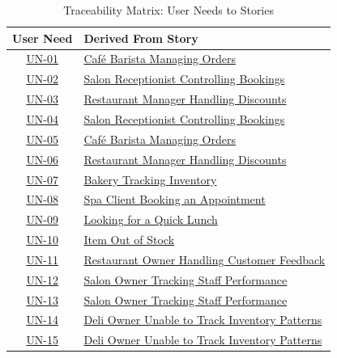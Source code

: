 \documentclass[]{VUMIFTemplateClass}
\begin{document}
\begin{table}[H]
\centering
\caption{Traceability Matrix: User Needs to Stories}
\begin{tabular}{|c|l|}
\hline
\textbf{User Need}  & \textbf{Derived From Story} \\
\hline
\hyperref[UN-01]{UN-01} & \hyperref[subsubsubsec:barista-orders]{Café Barista Managing Orders} \\
\hline
\hyperref[UN-02]{UN-02} & \hyperref[subsubsubsec:salon-receptionist]{Salon Receptionist Controlling Bookings} \\
\hline
\hyperref[UN-03]{UN-03} & \hyperref[subsubsubsec:restaurant-discounts]{Restaurant Manager Handling Discounts} \\
\hline
\hyperref[UN-04]{UN-04} & \hyperref[subsubsubsec:salon-receptionist]{Salon Receptionist Controlling Bookings} \\
\hline
\hyperref[UN-05]{UN-05} & \hyperref[subsubsubsec:barista-orders]{Café Barista Managing Orders} \\
\hline
\hyperref[UN-06]{UN-06} & \hyperref[subsubsubsec:restaurant-discounts]{Restaurant Manager Handling Discounts} \\
\hline
\hyperref[UN-07]{UN-07} & \hyperref[subsubsubsec:bakery-inventory]{Bakery Tracking Inventory} \\
\hline
\hyperref[UN-08]{UN-08} & \hyperref[subsubsubsec:spa-booking]{Spa Client Booking an Appointment} \\
\hline
\hyperref[UN-09]{UN-09} & \hyperref[subsubsubsec:quick-lunch]{Looking for a Quick Lunch} \\
\hline
\hyperref[UN-10]{UN-10} & \hyperref[subsubsubsec:item-out-of-stock]{Item Out of Stock} \\
\hline
\hyperref[UN-11]{UN-11} & \hyperref[subsubsubsec:owner-feedback]{Restaurant Owner Handling Customer Feedback} \\
\hline
\hyperref[UN-12]{UN-12} & \hyperref[subsubsubsec:owner-staff-performance]{Salon Owner Tracking Staff Performance} \\
\hline
\hyperref[UN-13]{UN-13} & \hyperref[subsubsubsec:owner-staff-performance]{Salon Owner Tracking Staff Performance} \\
\hline
\hyperref[UN-14]{UN-14} & \hyperref[subsubsubsec:deli-inventory]{Deli Owner Unable to Track Inventory Patterns} \\
\hline
\hyperref[UN-15]{UN-15} & \hyperref[subsubsubsec:deli-inventory]{Deli Owner Unable to Track Inventory Patterns} \\
\hline
\end{tabular}
\end{table}
\end{document}
